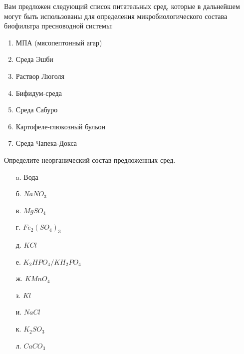 
Вам предложен следующий список питательных сред, которые в дальнейшем могут быть использованы для определения микробиологического состава биофильтра пресноводной системы:

\begin{enumerate}
    \item МПА (мясопептонный агар)
    \item Среда Эшби
    \item Раствор Люголя
    \item Бифидум-среда
    \item Среда Сабуро
    \item Картофеле-глюкозный бульон
    \item Среда Чапека-Докса
\end{enumerate}

Определите неорганический состав предложенных сред.

\begin{enumerate}
    \item[a.] Вода
    \item[б.] $NaNO_3$
    \item[в.] $MgSO_4$
    \item[г.] $Fe_2(SO_4)_3$
    \item[д.] $KCl$
    \item[е.] $K_2HPO_4 / KH_2PO_4$
    \item[ж.] $KMnO_4$
    \item[з.] $Kl$
    \item[и.] $NaCl$
    \item[к.] $K_2SO_3$
    \item[л.] $CaCO_3$
\end{enumerate}
